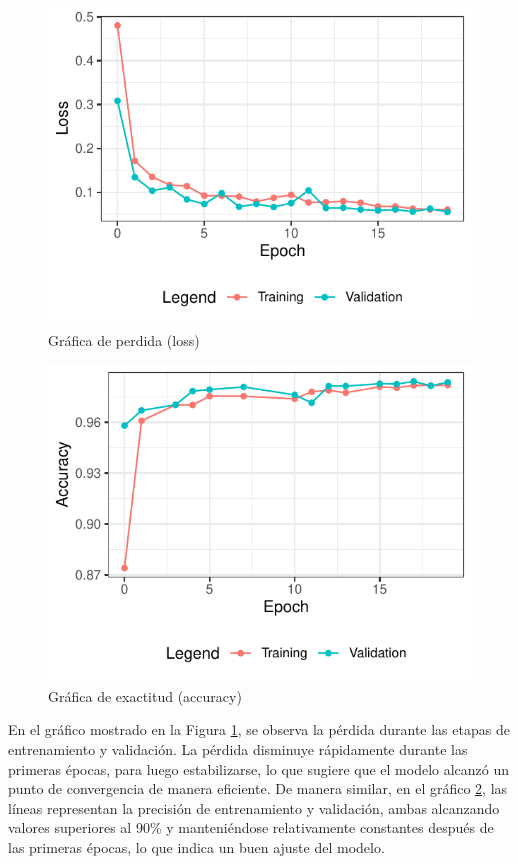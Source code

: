 \begin{figure}
 \centering
 \includegraphics[width=\columnwidth]{loss}
 \caption{Gráfica de perdida (loss)}
 \label{fig:loss}
\end{figure}

\begin{figure}
 \centering
 \includegraphics[width=\columnwidth]{accuracy}
 \caption{Gráfica de exactitud (accuracy)}
 \label{fig:accuracy}
\end{figure}

En el gráfico mostrado en la Figura \ref{fig:loss}, se observa la pérdida durante las etapas de  entrenamiento y validación. La pérdida disminuye rápidamente durante las primeras épocas, para luego estabilizarse, lo que sugiere que el modelo alcanzó un punto de convergencia de manera eficiente. De manera similar, en el gráfico \ref{fig:accuracy}, las líneas representan la precisión de entrenamiento y validación, ambas alcanzando valores superiores al 90\% y manteniéndose relativamente constantes después de las primeras épocas, lo que indica un buen ajuste del modelo.

